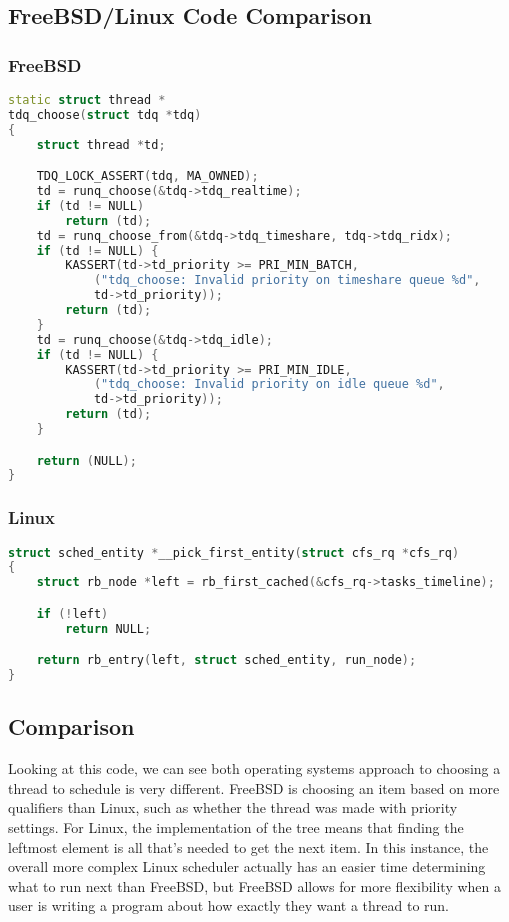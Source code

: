 \subsection{FreeBSD/Linux Code Comparison}
\subsubsection{FreeBSD}
\begin{lstlisting}[language=c++]
static struct thread *
tdq_choose(struct tdq *tdq)
{
	struct thread *td;

	TDQ_LOCK_ASSERT(tdq, MA_OWNED);
	td = runq_choose(&tdq->tdq_realtime);
	if (td != NULL)
		return (td);
	td = runq_choose_from(&tdq->tdq_timeshare, tdq->tdq_ridx);
	if (td != NULL) {
		KASSERT(td->td_priority >= PRI_MIN_BATCH,
		    ("tdq_choose: Invalid priority on timeshare queue %d",
		    td->td_priority));
		return (td);
	}
	td = runq_choose(&tdq->tdq_idle);
	if (td != NULL) {
		KASSERT(td->td_priority >= PRI_MIN_IDLE,
		    ("tdq_choose: Invalid priority on idle queue %d",
		    td->td_priority));
		return (td);
	}

	return (NULL);
}
\end{lstlisting}

\subsubsection{Linux}
\begin{lstlisting}[language=c++]
struct sched_entity *__pick_first_entity(struct cfs_rq *cfs_rq)
{
	struct rb_node *left = rb_first_cached(&cfs_rq->tasks_timeline);

	if (!left)
		return NULL;

	return rb_entry(left, struct sched_entity, run_node);
}
\end{lstlisting}

\subsection{Comparison}
Looking at this code, we can see both operating systems approach to choosing a thread to schedule is very different. FreeBSD is choosing an item based on more qualifiers than Linux, such as whether the thread was made with priority settings. For Linux, the implementation of the tree means that finding the leftmost element is all that's needed to get the next item. In this instance, the overall more complex Linux scheduler actually has an easier time determining what to run next than FreeBSD, but FreeBSD allows for more flexibility when a user is writing a program about how exactly they want a thread to run.